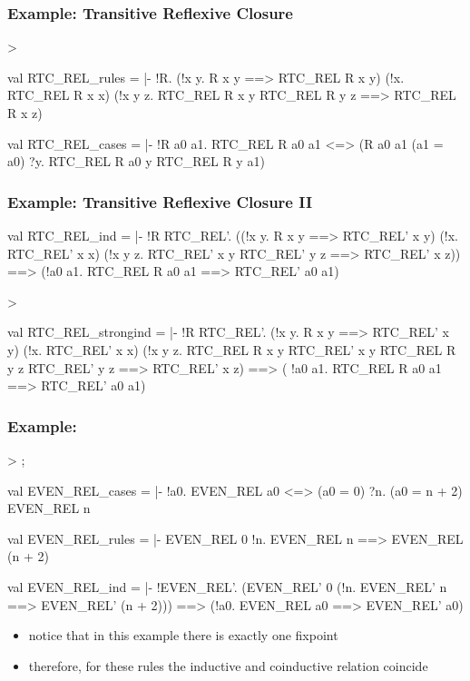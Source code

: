 \begin{frame}[fragile]
\frametitle{Example: Transitive Reflexive Closure}
\begin{semiverbatim}\scriptsize
> 

val RTC_REL_rules = |- !R.
  (!x y. R x y ==> RTC_REL R x y) \holAnd{} (!x. RTC_REL R x x) \holAnd{}
  (!x y z. RTC_REL R x y \holAnd{} RTC_REL R y z ==> RTC_REL R x z)

val RTC_REL_cases = |- !R a0 a1.
  RTC_REL R a0 a1 <=>
  (R a0 a1 \holOr{} (a1 = a0) \holOr{} ?y. RTC_REL R a0 y \holAnd{} RTC_REL R y a1)
\end{semiverbatim}
\end{frame}


\begin{frame}[fragile]
\frametitle{Example: Transitive Reflexive Closure II}
\begin{semiverbatim}\scriptsize
val RTC_REL_ind = |- !R RTC_REL'.
  ((!x y. R x y ==> RTC_REL' x y) \holAnd{} (!x. RTC_REL' x x) \holAnd{}
   (!x y z. RTC_REL' x y \holAnd{} RTC_REL' y z ==> RTC_REL' x z)) ==>
  (!a0 a1. RTC_REL R a0 a1 ==> RTC_REL' a0 a1)


> 

val RTC_REL_strongind = |- !R RTC_REL'.
  (!x y. R x y ==> RTC_REL' x y) \holAnd{} (!x. RTC_REL' x x) \holAnd{}
  (!x y z.
      RTC_REL R x y \holAnd{} RTC_REL' x y \holAnd{} RTC_REL R y z \holAnd{}
      RTC_REL' y z ==>
      RTC_REL' x z) ==>
  ( !a0 a1. RTC_REL R a0 a1 ==> RTC_REL' a0 a1)
\end{semiverbatim}
\end{frame}


\begin{frame}[fragile]
\frametitle{Example: }
\begin{semiverbatim}\scriptsize
> ;

val EVEN_REL_cases =
 |- !a0. EVEN_REL a0 <=> (a0 = 0) \holOr{} ?n. (a0 = n + 2) \holAnd{} EVEN_REL n

val EVEN_REL_rules =
 |- EVEN_REL 0 \holAnd{} !n. EVEN_REL n ==> EVEN_REL (n + 2)

val EVEN_REL_ind = |- !EVEN_REL'.
   (EVEN_REL' 0 \holAnd{} (!n. EVEN_REL' n ==> EVEN_REL' (n + 2))) ==>
   (!a0. EVEN_REL a0 ==> EVEN_REL' a0)
\end{semiverbatim}
\begin{itemize}
\item notice that in this example there is exactly one fixpoint
\item therefore, for these rules the inductive and coinductive relation coincide
\end{itemize}
\end{frame}


